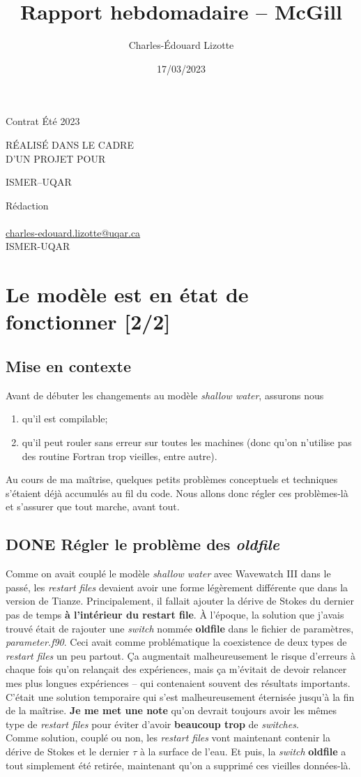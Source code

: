 \documentclass[10pt]{article}
\author{Charles-Édouard Lizotte}
\date{17/03/2023}
\title{Rapport hebdomadaire -- McGill}
\makeatletter
\numberwithin{equation}{section}
\newcommand{\mytitlepage}{
\begin{titlepage}
\begin{center}
{\Large Contrat Été 2023 \par}
\vspace{2cm}
{\Large \MakeUppercase{\thetitle} \par}
\vspace{2cm}
RÉALISÉ DANS LE CADRE\\ D'UN PROJET POUR \par
\vspace{2cm}
{\Large ISMER--UQAR \par}
\vspace{2cm}
{\thedate}
\end{center}
\vfill
Rédaction \\
{\theauthor}\\
\url{charles-edouard.lizotte@uqar.ca}\\
ISMER-UQAR
\end{titlepage}
}
\makeatother
\begin{document}
\mytitlepage
\tableofcontents\newpage

\section{Le modèle est en état de fonctionner [2/2]}
\label{sec:orgd1a6b5e}
\subsection{Mise en contexte}
\label{sec:org2e39d57}
Avant de débuter les changements au modèle \emph{shallow water}, assurons nous 
\begin{enumerate}
\item qu'il est compilable;
\item qu'il peut rouler sans erreur sur toutes les machines (donc qu'on n'utilise pas des routine Fortran trop vieilles, entre autre).
\end{enumerate}
Au cours de ma maîtrise, quelques petits problèmes conceptuels et techniques s'étaient déjà accumulés au fil du code.
Nous allons donc régler ces problèmes-là et s'assurer que tout marche, avant tout. 

\subsection{{\bfseries\sffamily DONE} Régler le problème des \emph{oldfile}}
\label{sec:org087ed6b}
Comme on avait couplé le modèle \emph{shallow water} avec Wavewatch III dans le passé, les \emph{restart files} devaient avoir une forme légèrement différente que dans la version de Tianze.
Principalement, il fallait ajouter la dérive de Stokes du dernier pas de temps \textbf{à l'intérieur du restart file}.
À l'époque, la solution que j'avais trouvé était de rajouter une \emph{switch} nommée \textbf{oldfile} dans le fichier de paramètres, \emph{parameter.f90}.
Ceci avait comme problématique la coexistence de deux types de \emph{restart files} un peu partout. 
Ça augmentait malheureusement le risque d'erreurs à chaque fois qu'on relançait des expériences, mais ça m'évitait de devoir relancer mes plus longues expériences -- qui contenaient souvent des résultats importants.
C'était une solution temporaire qui s'est malheureusement éternisée jusqu'à la fin de la maîtrise. 
\textbf{Je me met une note} qu'on devrait toujours avoir les mêmes type de \emph{restart files} pour éviter d'avoir \textbf{beaucoup trop} de \emph{switches}.\\[0pt]

Comme solution, couplé ou non, les \emph{restart files} vont maintenant contenir la dérive de Stokes et le dernier \(\tau\) à la surface de l'eau.
Et puis, la \emph{switch} \textbf{oldfile} a tout simplement été retirée, maintenant qu'on a supprimé ces vieilles données-là.
\end{document}
